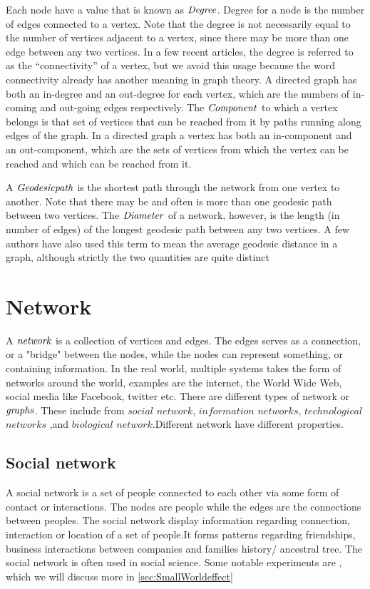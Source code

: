 Each node have a value that is known as $\it{{Degree}}$. Degree for a node is the number of edges connected to a vertex. Note that the degree is not necessarily equal to the number of vertices adjacent to a vertex, since there may be more than one edge between any two vertices. In a few recent articles, the degree is referred to as the “connectivity” of a vertex, but we avoid this usage because the word connectivity already has another meaning in graph theory. A directed graph has both an in-degree and an out-degree for each vertex, which are the numbers of in-coming and out-going edges respectively. The $\it{{Component}}$ to which a vertex belongs is that set of vertices that can be reached from it by paths running along edges of the graph. In a directed graph a vertex has both an in-component and an out-component, which are the sets of vertices from which the vertex can be reached and which can be reached from it.

A $\it{{Geodesic path}}$ is the shortest path through the network from one vertex to another. Note that there may be and often is more than one geodesic path between two vertices. The $\it{{Diameter}}$ of a network, however,  is the length (in number of edges) of the longest geodesic path between any two vertices. A few authors have also used this term to mean the average geodesic distance in a graph, although strictly the two quantities are quite distinct

\section{Network}
A $\it{network}$ is a collection of vertices and edges\cite{ComplexNetwork2003}. The edges serves as a connection, or a "bridge" between the nodes, while the nodes can represent something, or containing information. In the real world, multiple systems takes the form of networks around the world, examples are the internet, the World Wide Web, social media like Facebook, twitter etc.  There are different types of network or $\it{graphs}$. These include from $social$ $network$, ${information}$ ${networks}$, $technological$ $networks$ ,and $biological$ $network$.Different network have different properties. 

\subsection{Social network}
A social network is a set of people connected to each other via some form of contact or interactions\cite{ComplexNetwork2003}. The nodes are people while the edges are the connections between peoples. The social network display information regarding connection, interaction or location of a set of people.It forms patterns regarding friendships, business interactions between companies and families history/ ancestral tree. The social network is often used in social science\cite{ComplexNetwork2003}. Some notable experiments are \cite{smallWorldExperiment}, which we will discuss more in \ref{sec:SmallWorldeffect} 

